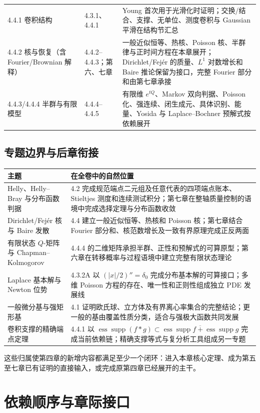 \documentclass[11pt,a4paper]{ctexart}
\newcommand{\ess}{\operatorname*{ess}}
\newcommand{\supp}{\operatorname{supp}}
\begin{document}
\begin{longtable}{p{}p{}p{}}
4.4.1 卷积结构 & 4.3.1、4.4.1 & Young 首次用于光滑化时证明；交换/结合、支撑、无单位、测度卷积与 Gaussian 平滑在结构节汇总\\
4.4.2 核与恢复（含 Fourier/Brownian 解释） & 4.4.2--4.4.3；第六、七章 & 一般近似恒等、热核、Poisson 核、半群律与正时间方程在本章展开；Dirichlet/Fej\'er 的质量、$L^1$ 对数增长和 Baire 推论保留为接口，完整 Fourier 部分和由第七章承接\\
4.4.3/4.4.4 半群与有限模型 & 4.4.4--4.4.5 & 有限维 $e^{tQ}$、Markov 双向判据、Poisson 化、强连续、闭生成元、具体识别、能量、Yosida 与 Laplace--Bochner 预解式按依赖展开\\
\bottomrule
\end{longtable}

\subsection{专题边界与后章衔接}

\begin{longtable}{p{}p{}}
\toprule
主题 & 在全卷中的自然位置\\
\midrule
Helly、Helly--Bray 与分布函数判据 & 4.2 完成规范端点二元组及任意代表的四项端点账本、Stieltjes 测度和连续测试积分；第七章在整轴质量控制的语境中完成选择定理与分布函数收敛\\
Dirichlet/Fej\'er 核与 Baire 发散 & 4.4 建立一般近似恒等、热核和 Poisson 核；第七章结合 Fourier 部分和、核范数增长及一致有界原理完成正反两面\\
有限状态 $Q$-矩阵与 Chapman--Kolmogorov & 4.4.4 的二维矩阵承担半群、正性和预解式的可算原型；第六章在转移概率与过程语境中建立完整有限状态理论\\
Laplace 基本解与 Newton 位势 & 4.3.2A 以 $(|x|/2)''=\delta_0$ 完成分布基本解的可算接口；多维 Poisson 方程的存在、唯一性和正则性组成独立 PDE 发展线\\
一般微分基与强矩形基 & 4.1 证明欧氏球、立方体及有界离心率集合的完整结论；更一般的基由覆盖性质分类，适合与强极大函数共同发展\\
卷积支撑的精确端点定理 & 4.4.1 以 $\ess\supp(f*g)\subset\overline{\ess\supp f+\ess\supp g}$ 完成当前依赖链；精确支撑等式与复分析工具组成另一专题\\
\bottomrule
\end{longtable}

这些归属使第四章的新增内容都满足至少一个闭环：进入本章核心定理、成为第五至七章已有证明的直接输入，或完成原第四章已经展开的主干。

\section{依赖顺序与章际接口}
\end{document}
